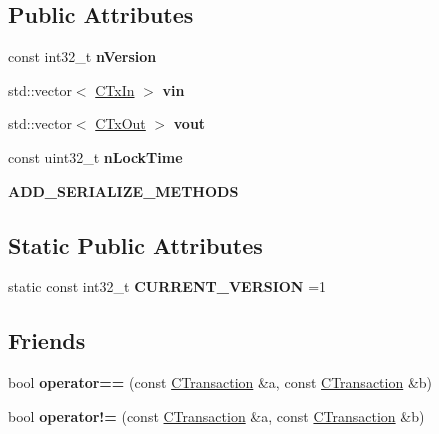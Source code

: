 \subsection*{Public Attributes}
\begin{DoxyCompactItemize}
\item 
\mbox{\label{class_c_transaction_abda727662de83b84dc2ef56d30690cb1}} 
const int32\+\_\+t {\bfseries n\+Version}
\item 
\mbox{\label{class_c_transaction_a53fa787e4ea57374b4fa2a28e9a957b2}} 
std\+::vector$<$ \mbox{\hyperlink{class_c_tx_in}{C\+Tx\+In}} $>$ {\bfseries vin}
\item 
\mbox{\label{class_c_transaction_ae42c0032a464c3054c508017c7d040ef}} 
std\+::vector$<$ \mbox{\hyperlink{class_c_tx_out}{C\+Tx\+Out}} $>$ {\bfseries vout}
\item 
\mbox{\label{class_c_transaction_a54d5948c11f499b28276eab6bbfdf0c5}} 
const uint32\+\_\+t {\bfseries n\+Lock\+Time}
\item 
\mbox{\label{class_c_transaction_a329b40b323445b322ab460c966669944}} 
{\bfseries A\+D\+D\+\_\+\+S\+E\+R\+I\+A\+L\+I\+Z\+E\+\_\+\+M\+E\+T\+H\+O\+DS}
\end{DoxyCompactItemize}
\subsection*{Static Public Attributes}
\begin{DoxyCompactItemize}
\item 
\mbox{\label{class_c_transaction_afcc5960eab9d35f10c6f8e6675bf2a93}} 
static const int32\+\_\+t {\bfseries C\+U\+R\+R\+E\+N\+T\+\_\+\+V\+E\+R\+S\+I\+ON} =1
\end{DoxyCompactItemize}
\subsection*{Friends}
\begin{DoxyCompactItemize}
\item 
\mbox{\label{class_c_transaction_a1afe3b8f0f0daca6f653756ee44c9e44}} 
bool {\bfseries operator==} (const \mbox{\hyperlink{class_c_transaction}{C\+Transaction}} \&a, const \mbox{\hyperlink{class_c_transaction}{C\+Transaction}} \&b)
\item 
\mbox{\label{class_c_transaction_ab7c00027d7a2622792736f6a3a579d5d}} 
bool {\bfseries operator!=} (const \mbox{\hyperlink{class_c_transaction}{C\+Transaction}} \&a, const \mbox{\hyperlink{class_c_transaction}{C\+Transaction}} \&b)
\end{DoxyCompactItemize}


